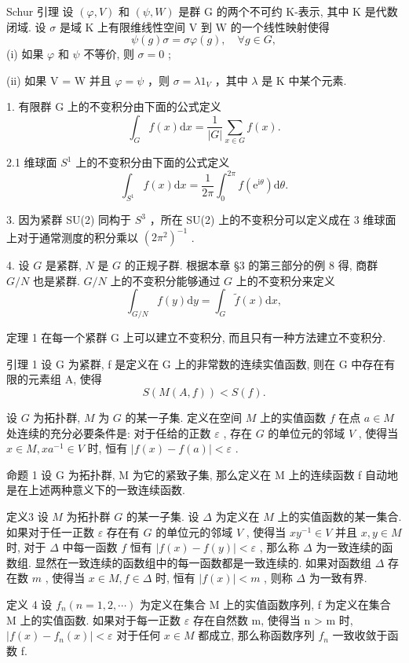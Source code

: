 \documentclass[]{article}
\begin{document}
Schur 引理 设 $(\varphi, V)$ 和 $(\psi, W)$ 是群 G 的两个不可约 K-表示, 其中 K 是代数闭域. 设 $\sigma$ 是域 K 上有限维线性空间 V 到 W 的一个线性映射使得 $$
\psi (g) \sigma = \sigma \varphi (g), \quad \forall g \in G,
$$
(i) 如果 $\varphi$ 和 $\psi$ 不等价, 则 $\sigma = 0$ ; 

(ii) 如果 V = W 并且 $\varphi = \psi$ ，则 $\sigma = \lambda 1_{V}$ ，其中 $\lambda$ 是 K 中某个元素. 

1. 有限群 G 上的不变积分由下面的公式定义 $$
\int_ {G} f (x) \mathrm{d} x = \frac {1}{| G |} \sum_ {x \in G} f (x).
$$

2.1 维球面 $S^{1}$ 上的不变积分由下面的公式定义 $$
\int_ {S ^ {1}} f (x) \mathrm{d} x = \frac {1}{2 \pi} \int_ {0} ^ {2 \pi} f (\mathrm{e} ^ {\mathrm{i} \theta}) \mathrm{d} \theta .
$$

3. 因为紧群 SU(2) 同构于 $S^{3}$ ，所在 SU(2) 上的不变积分可以定义成在 3 维球面上对于通常测度的积分乘以 $(2\pi^{2})^{-1}$ . 

4. 设 $G$ 是紧群, $N$ 是 $G$ 的正规子群. 根据本章 §3 的第三部分的例 8 得, 商群 $G / N$ 也是紧群. $G / N$ 上的不变积分能够通过 $G$ 上的不变积分来定义 $$
\int_ {G / N} f (y) \mathrm{d} y = \int_ {G} \widetilde {f} (x) \mathrm{d} x,
$$

定理 1 在每一个紧群 G 上可以建立不变积分, 而且只有一种方法建立不变积分. 

引理 1 设 G 为紧群, f 是定义在 G 上的非常数的连续实值函数, 则在 G 中存在有限的元素组 A, 使得$$
S (M (A, f)) <   S (f). 
$$

设 $G$ 为拓扑群, $M$ 为 $G$ 的某一子集. 定义在空间 $M$ 上的实值函数 $f$ 在点 $a \in M$ 处连续的充分必要条件是: 对于任给的正数 $\varepsilon$ , 存在 $G$ 的单位元的邻域 $V$ , 使得当 $x \in M, xa^{-1} \in V$ 时, 恒有 $|f(x) - f(a)| < \varepsilon$ . 

命题 1 设 G 为拓扑群, M 为它的紧致子集, 那么定义在 M 上的连续函数 f 自动地是在上述两种意义下的一致连续函数. 

定义3 设 $M$ 为拓扑群 $G$ 的某一子集. 设 $\Delta$ 为定义在 $M$ 上的实值函数的某一集合. 如果对于任一正数 $\varepsilon$ 存在有 $G$ 的单位元的邻域 $V$ , 使得当 $xy^{-1} \in V$ 并且 $x, y \in M$ 时, 对于 $\Delta$ 中每一函数 $f$ 恒有 $|f(x) - f(y)| < \varepsilon$ , 那么称 $\Delta$ 为一致连续的函数组. 显然在一致连续的函数组中的每一函数都是一致连续的. 如果对函数组 $\Delta$ 存在数 $m$ , 使得当 $x \in M, f \in \Delta$ 时, 恒有 $|f(x)| < m$ , 则称 $\Delta$ 为一致有界. 

定义 4 设 $f_{n}(n=1,2,\cdots)$ 为定义在集合 M 上的实值函数序列, f 为定义在集合 M 上的实值函数. 如果对于每一正数 $\varepsilon$ 存在自然数 m, 使得当 n > m 时, $|f(x)-f_{n}(x)|<\varepsilon$ 对于任何 $x\in M$ 都成立, 那么称函数序列 $f_{n}$ 一致收敛于函数 f. 
\end{document}

